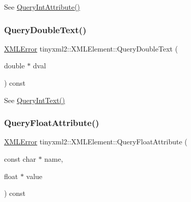 See \hyperlink{classtinyxml2_1_1_x_m_l_element_a8a78bc1187c1c45ad89f2690eab567b1}{Query\+Int\+Attribute()} 

\mbox{\label{classtinyxml2_1_1_x_m_l_element_a684679c99bb036a25652744cec6c4d96}} 
\subsubsection{\texorpdfstring{Query\+Double\+Text()}{QueryDoubleText()}}
{\footnotesize\ttfamily \hyperlink{namespacetinyxml2_a1fbf88509c3ac88c09117b1947414e08}{X\+M\+L\+Error} tinyxml2\+::\+X\+M\+L\+Element\+::\+Query\+Double\+Text (\begin{DoxyParamCaption}\item[{double $\ast$}]{dval }\end{DoxyParamCaption}) const}



See \hyperlink{classtinyxml2_1_1_x_m_l_element_a926357996bef633cb736e1a558419632}{Query\+Int\+Text()} 

\mbox{\label{classtinyxml2_1_1_x_m_l_element_acd5eeddf6002ef90806af794b9d9a5a5}} 
\subsubsection{\texorpdfstring{Query\+Float\+Attribute()}{QueryFloatAttribute()}}
{\footnotesize\ttfamily \hyperlink{namespacetinyxml2_a1fbf88509c3ac88c09117b1947414e08}{X\+M\+L\+Error} tinyxml2\+::\+X\+M\+L\+Element\+::\+Query\+Float\+Attribute (\begin{DoxyParamCaption}\item[{const char $\ast$}]{name,  }\item[{float $\ast$}]{value }\end{DoxyParamCaption}) const\hspace{0.3cm}{\ttfamily [inline]}}



